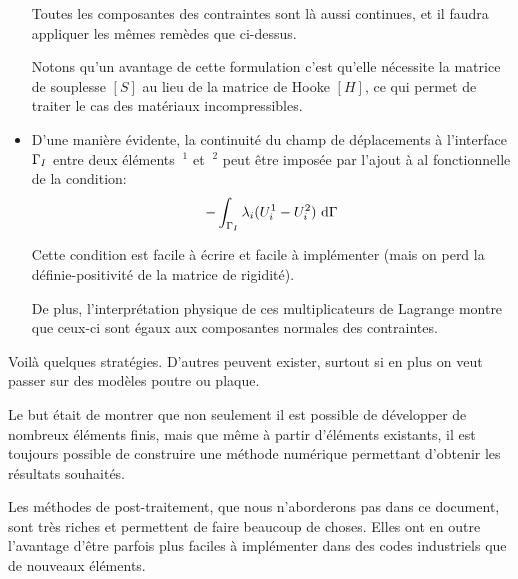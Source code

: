 \begin{itemize}
	Toutes les composantes des contraintes sont là aussi continues, et il faudra appliquer les
	mêmes remèdes que ci-dessus.

	Notons qu'un avantage de cette formulation c'est qu'elle nécessite la matrice
	de souplesse $[S]$ au lieu de la matrice de Hooke $[H]$, ce qui permet de
	traiter le cas des matériaux incompressibles.
   \item {}
	
	D'une manière évidente, la continuité{} du champ de dé{}placements
	à{} l'interface $\Gamma_I$ entre deux é{}lé{}ments $~^1$ et $~^2$ peut ê{}tre
	imposé{}e par l'ajout à al fonctionnelle de la condition:
	\begin{equation}   -\dint_{\li} \lambda_i(U_i^1-U_i^2)\ \dd\Gamma \end{equation}

	Cette condition est facile à écrire et facile à implémenter (mais on perd la
	définie-positivité de la matrice de rigidité).
	
	De plus, l'interprétation physique de ces multiplicateurs de Lagrange montre
	que ceux-ci sont égaux aux composantes normales des contraintes.
\end{itemize}

\medskip
Voilà quelques stratégies. D'autres peuvent exister, surtout si en plus on veut passer
sur des modèles poutre ou plaque.

Le but était de montrer que non seulement il est possible de développer de nombreux
éléments finis, mais que même à partir d'éléments existants, il est toujours
possible de construire une méthode numérique permettant d'obtenir les résultats
souhaités.

Les méthodes de post-traitement, que nous n'aborderons pas dans ce document,
sont très riches et permettent de faire beaucoup de choses.
Elles ont en outre l'avantage d'être parfois plus faciles à implémenter dans des
codes industriels que de nouveaux éléments.




















